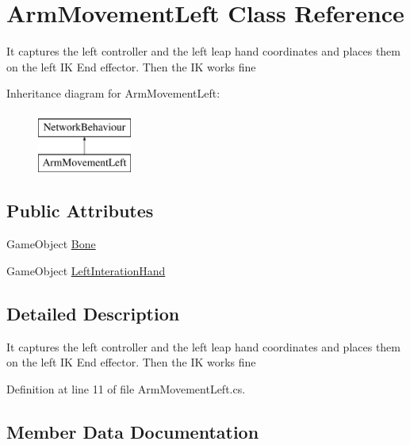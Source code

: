 \hypertarget{class_arm_movement_left}{}\section{Arm\+Movement\+Left Class Reference}
\label{class_arm_movement_left}


It captures the left controller and the left leap hand coordinates and places them on the left IK End effector. Then the IK works fine  


Inheritance diagram for Arm\+Movement\+Left\+:\begin{figure}[H]
\begin{center}
\leavevmode
\includegraphics[height=2.000000cm]{class_arm_movement_left}
\end{center}
\end{figure}
\subsection*{Public Attributes}
\begin{DoxyCompactItemize}
\item 
Game\+Object \mbox{\hyperlink{class_arm_movement_left_a4fd2c7da95bc82d0a577a31c2cdb55f8}{Bone}}
\item 
Game\+Object \mbox{\hyperlink{class_arm_movement_left_a4e4cae8b4605f31c2a8a74b7bcb14ce3}{Left\+Interation\+Hand}}
\end{DoxyCompactItemize}


\subsection{Detailed Description}
It captures the left controller and the left leap hand coordinates and places them on the left IK End effector. Then the IK works fine 



Definition at line 11 of file Arm\+Movement\+Left.\+cs.



\subsection{Member Data Documentation}
\mbox{\label{class_arm_movement_left_a4fd2c7da95bc82d0a577a31c2cdb55f8}} 
